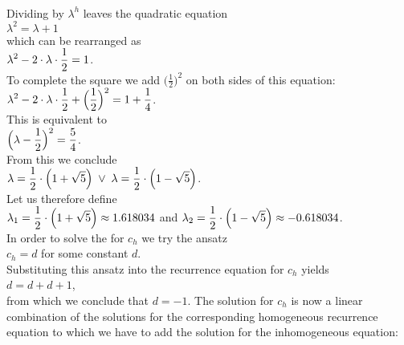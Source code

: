 \\[0.2cm]
Dividing by $\lambda^h$ leaves the quadratic equation
\\[0.2cm]
\hspace*{1.3cm}
$\lambda^2 = \lambda + 1$
\\[0.2cm]
which can be rearranged as
\\[0.2cm]
\hspace*{1.3cm}
$\displaystyle \lambda^2 - 2 \cdot \lambda \cdot \frac{1}{2} = 1$.
\\[0.2cm]
To complete the square we add $\bigl(\frac{1}{2}\bigr)^2$ on both sides of this equation:
\\[0.2cm]
\hspace*{1.3cm}
$\displaystyle \lambda^2 - 2 \cdot \lambda \cdot \frac{1}{2} + \Bigl(\frac{1}{2}\Bigr)^2 = 1 + \frac{1}{4}$.
\\[0.2cm]
This is equivalent to
\\[0.2cm]
\hspace*{1.3cm}
$\displaystyle \Bigl(\lambda - \frac{1}{2}\Bigr)^2 = \frac{5}{4}$. 
\\[0.2cm]
From this we conclude 
\\[0.2cm]
\hspace*{1.3cm}
$\displaystyle\lambda = \frac{1}{2} \cdot \Bigl(1 + \sqrt{5}\Bigr) \;\vee\; \lambda = \frac{1}{2} \cdot \Bigl(1 - \sqrt{5}\Bigr)$.
\\[0.2cm]
Let us therefore define 
\\[0.2cm]
\hspace*{1.3cm}
$\displaystyle\lambda_1 =  \frac{1}{2} \cdot \Bigl(1 + \sqrt{5}\Bigr) \approx  1.618034$ \quad and \quad 
$\displaystyle\lambda_2 = \frac{1}{2} \cdot \Bigl(1 - \sqrt{5}\Bigr) \approx -0.618034$.
\\[0.2cm]
In order to solve the  for $c_h$ we try the ansatz
\\[0.2cm]
\hspace*{1.3cm}
$c_h = d$ \quad for some constant $d$.
\\[0.2cm]
Substituting this ansatz into the recurrence equation for $c_h$ yields
\\[0.2cm]
\hspace*{1.3cm}
$d = d + d + 1$,
\\[0.2cm]
from which we conclude that $d = -1$.  The solution for $c_h$ is now a linear combination of the solutions for
the corresponding homogeneous recurrence equation to which we have to add the solution for the inhomogeneous equation:
\\[0.2cm]
\hspace*{1.3cm}
